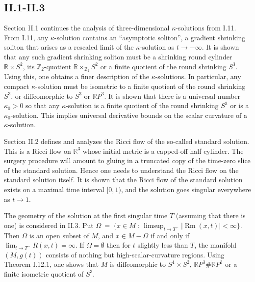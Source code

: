 \documentclass[12pt]{amsart}
\newcommand{\R}{{\mathbb R}}
\newcommand{\Rm}{\operatorname{Rm}}
\newcommand{\Z}{{\mathbb Z}}
\numberwithin{equation}{section}
\theoremstyle{plain}
\theoremstyle{definition}
\theoremstyle{remark}
\begin{document}
\subsection{II.1-II.3}

Section II.1 continues the analysis of three-dimensional
$\kappa$-solutions from I.11.  From I.11, any $\kappa$-solution
contains an ``asymptotic soliton'', a gradient shrinking
soliton that arises as a rescaled limit of the $\kappa$-solution
as $t \rightarrow - \infty$. It is shown that any such
gradient shrinking soliton must be a shrinking round cylinder $\R \times S^2$,
its $\Z_2$-quotient $\R \times_{\Z_2} S^2$
or a finite quotient of the
round shrinking $S^3$. Using this, one
obtains a finer description of the $\kappa$-solutions. In 
particular, any compact $\kappa$-solution must be isometric
to a finite quotient of the round shrinking $S^3$, or
diffeomorphic to $S^3$ or $\R P^3$. It is shown that there is
a universal number $\kappa_0 > 0$ so that any $\kappa$-solution
is a finite quotient of the round shrinking $S^3$ or is a
$\kappa_0$-solution. This implies universal
derivative bounds on the scalar curvature of a $\kappa$-solution.

Section II.2 defines and analyzes the Ricci flow of the
so-called standard solution.  This is a Ricci flow on $\R^3$ whose
initial metric is a capped-off half cylinder.  The surgery
procedure will amount to gluing in a truncated copy of the
time-zero slice of the standard solution. Hence one
needs to understand the Ricci flow on the standard solution
itself.  It is shown that the Ricci flow of the standard
solution exists on a maximal time interval $[0,1)$, and the
solution goes singular everywhere as $t \rightarrow 1$. 

The geometry of the solution at the first singular time $T$
(assuming that there is one) is considered in II.3.  Put
$\Omega \: = \: \{x \in M \: : \: \limsup_{t \rightarrow T^-} 
|\Rm(x,t)| < \infty \}$. Then $\Omega$ is an open subset of $M$,
and $x \in M-\Omega$ if and only if $\lim_{t \rightarrow T^-}
R(x,t) = \infty$. If $\Omega = \emptyset$ then for $t$ slightly less than $T$,
the manifold $(M, g(t))$ consists of nothing but high-scalar-curvature
regions. Using Theorem I.12.1, one shows that 
$M$ is diffeomorphic to 
$S^1 \times S^2$, $\R P^3 \# \R P^3$ or
a finite isometric quotient of $S^3$.
\end{document}
